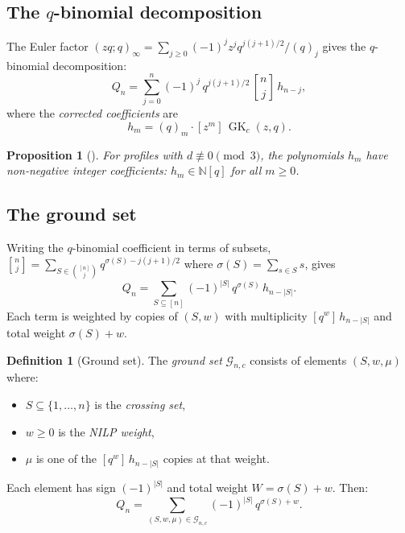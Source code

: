 \documentclass[11pt]{article}
\newcommand{\N}{\mathbb{N}}
\newcommand{\GK}{\operatorname{GK}}
\newcommand{\qpoch}[2]{(#1;#2)_\infty}
\newcommand{\qbin}[2]{\genfrac{[}{]}{0pt}{}{#1}{#2}}
\theoremstyle{plain}
\newtheorem{proposition}[theorem]{Proposition}
\theoremstyle{definition}
\newtheorem{definition}[theorem]{Definition}
\begin{document}
\subsection{The $q$-binomial decomposition}

The Euler factor
$\qpoch{zq}{q} = \sum_{j \geq 0}
  (-1)^j z^j q^{j(j+1)/2} / (q)_j$
gives the $q$-binomial decomposition:
\begin{equation}\label{eq:q-binom}
  Q_n = \sum_{j=0}^{n} (-1)^j\, q^{j(j+1)/2}\,
    \qbin{n}{j}\, h_{n-j},
\end{equation}
where the \emph{corrected coefficients} are
\begin{equation}\label{eq:h-def}
  h_m = (q)_m \cdot [z^m]\, \GK_c(z,q).
\end{equation}

\begin{proposition}[{\cite{Q_NILP}}]
\label{prop:h-nonneg}
For profiles with $d \not\equiv 0 \pmod{3}$, the
polynomials $h_m$ have non-negative integer coefficients:
$h_m \in \N[q]$ for all $m \geq 0$.
\end{proposition}


\subsection{The ground set}

Writing the $q$-binomial coefficient in terms of subsets,
$\qbin{n}{j} = \sum_{S \in \binom{[n]}{j}}
  q^{\sigma(S) - j(j+1)/2}$
where $\sigma(S) = \sum_{s \in S} s$, gives
\begin{equation}\label{eq:Q-ground}
  Q_n = \sum_{S \subseteq [n]} (-1)^{|S|}\,
    q^{\sigma(S)}\, h_{n - |S|}.
\end{equation}
Each term is weighted by copies of $(S, w)$ with
multiplicity $[q^w]\, h_{n-|S|}$ and total weight
$\sigma(S) + w$.

\begin{definition}[Ground set]
\label{def:ground-set}
The \emph{ground set} $\mathcal{G}_{n,c}$ consists of
elements $(S, w, \mu)$ where:
\begin{itemize}
  \item $S \subseteq \{1, \ldots, n\}$ is the
    \emph{crossing set},
  \item $w \geq 0$ is the \emph{NILP weight},
  \item $\mu$ is one of the $[q^w]\, h_{n-|S|}$ copies at
    that weight.
\end{itemize}
Each element has sign $(-1)^{|S|}$ and total weight
$W = \sigma(S) + w$.  Then:
\[
  Q_n = \sum_{(S, w, \mu) \in \mathcal{G}_{n,c}}
    (-1)^{|S|}\, q^{\sigma(S) + w}.
\]
\end{definition}
\end{document}
